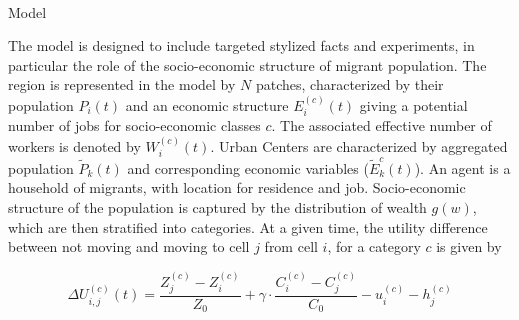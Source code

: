 


\paragraph{}{Model}


The model is designed to include targeted stylized facts and experiments, in particular the role of the socio-economic structure of migrant population. %
 The region is represented in the model by $N$ patches, characterized by their population $P_i(t)$ and an economic structure $E_i^{(c)}(t)$ giving a potential number of jobs for socio-economic classes $c$. The associated effective number of workers is denoted by $W_i^{(c)}(t)$.%
 Urban Centers are characterized by aggregated population $\tilde{P}_k(t)$ and corresponding economic variables ($\tilde{E}_k^{c}(t)$). An agent is a household of migrants, with location for residence and job. Socio-economic structure of the population is captured by the distribution of wealth $g(w)$, which are then stratified into categories. At a given time, the utility difference between not moving and moving to cell $j$ from cell $i$, for a category $c$ is given by

\[
\Delta U_{i,j}^{(c)}(t) = \frac{Z_j^{(c)}- Z_i^{(c)}}{Z_0} + \gamma \cdot \frac{C_i^{(c)}- C_j^{(c)}}{C_0} - u_i^{(c)} - h_j^{(c)}
\]

